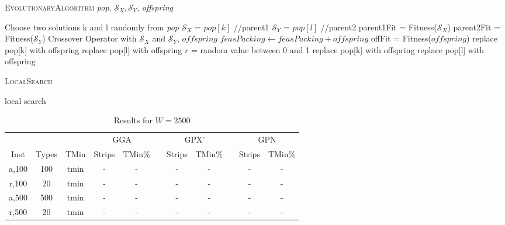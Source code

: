 \documentclass{elsarticle}
\begin{document}
\begin{algorithm}
\caption{\textsc{EvolutionaryAlgorithm} \textit{pop}, $\mathcal{S}_X, \mathcal{S}_Y$, \textit{offspring}}
\begin{algorithmic}
	\State Choose two solutions k and l randomly from \textit{pop}
	\State $\mathcal{S}_X$ = $pop[k]$ //parent1
	\State $\mathcal{S}_Y$ = $pop[l]$ //parent2
	\State parent1Fit = Fitness($\mathcal{S}_X$)
	\State parent2Fit = Fitness($\mathcal{S}_Y$)
	\Run Crossover Operator with $\mathcal{S}_X$ and $\mathcal{S}_Y$, \Output $offspring$
	\State $feasPacking \gets feasPacking + offspring$
	\State offFit = Fitness($offspring$)
		\State replace pop[k] with offspring
		\State replace pop[l] with offspring
		\State $r$ = random value between 0 and 1
			\State replace pop[k] with offspring
			\State replace pop[l] with offspring
		\EndIf		
	\EndIf	
\end{algorithmic}	
\end{algorithm}	

\begin{algorithm}
	\caption{\textsc{LocalSearch}}
	\begin{algorithmic}
		\State local search
	\end{algorithmic}	
\end{algorithm}

\begin{table}[h!]
	\centering
	\caption{Results for $W=2500$}
	\begin{tabular}{ccccccccccc}\toprule
		& & &\multicolumn{2}{c}{GGA} &\phantom{a}& \multicolumn{2}{c}{GPX'} &\phantom{a}& \multicolumn{2}{c}{GPN}\\
		\cmidrule{4-5} \cmidrule{7-8} \cmidrule{10-11}
		Inst & Types &TMin & Strips & TMin$\%$ && Strips & TMin$\%$ && Strips & TMin$\%$ \\ \midrule	
		a,100 & 100 & tmin & - & - && - & - && - & -\\
		r,100 & 20 & tmin & - & - && - & - && - & -\\
		\midrule
		a,500 & 500 & tmin & - & - && - & - && - & -\\
		r,500 & 20 & tmin & - & - && - & - && - & -\\
		\bottomrule
	\end{tabular}	
	\label{table:EA2500}
\end{table}
\end{document}
